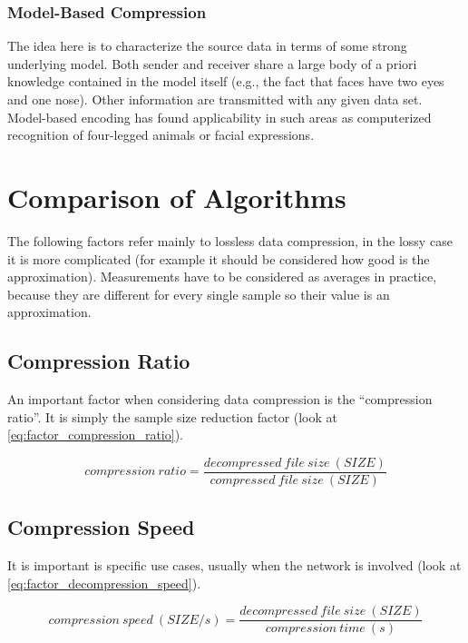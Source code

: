 \documentclass[12pt, a4paper]{report}
\begin{document}
\subsubsection{Model-Based Compression}

The idea here is to characterize the source data in terms of some strong underlying model.
Both sender and receiver share a large body of a priori knowledge contained in the model itself (e.g., the fact that faces have
two eyes and one nose).
Other information are transmitted with any given data set.
Model-based encoding has found applicability in such areas as computerized recognition of four-legged animals or facial
expressions.

\section{Comparison of Algorithms}

The following factors refer mainly to lossless data compression, in the lossy case it is more complicated (for example it should
be considered how good is the approximation).
Measurements have to be considered as averages in practice, because they are different for every single sample so their value is
an approximation.

\subsection{Compression Ratio}

An important factor when considering data compression is the ``compression ratio''. It is simply the sample size reduction factor
(look at \autoref{eq:factor_compression_ratio}).

\begin{equation} \label{eq:factor_compression_ratio}
  compression\ ratio = \frac{decompressed\ file\ size\ (SIZE)}{compressed\ file\ size\ (SIZE)}
\end{equation}

\subsection{Compression Speed}

It is important is specific use cases, usually when the network is involved (look at \autoref{eq:factor_decompression_speed}).

\begin{equation} \label{eq:factor_compression_speed}
  compression\ speed\ (SIZE / s) = \frac{decompressed\ file\ size\ (SIZE)}{compression\ time\ (s)}
\end{equation}
\end{document}
